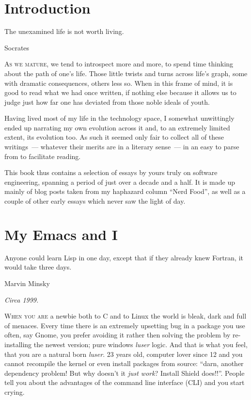 \documentclass{book}
\begin{document}
\pagestyle{empty}
\clearpage

\chapter{Introduction}

\epigraph{The unexamined life is not worth living.}{Socrates}

\lettrine{A}{s we mature}, we tend to introspect more and more, to
spend time thinking about the path of one's life. Those little twists
and turns across life's graph, some with dramatic consequences, others
less so. When in this frame of mind, it is good to read what we had
once written, if nothing else because it allows us to judge just how
far one has deviated from those noble ideals of youth.

Having lived most of my life in the technology space, I somewhat
unwittingly ended up narrating my own evolution across it and, to an
extremely limited extent, its evolution too. As such it seemed only
fair to collect all of these writings~--- whatever their merits are in
a literary sense~--- in an easy to parse from to facilitate reading.

This book thus contains a selection of essays by yours truly on
software engineering, spanning a period of just over a decade and a
half. It is made up mainly of blog posts taken from my haphazard
column ``Nerd Food'', as well as a couple of other early essays which
never saw the light of day.

\pagestyle{headings}

\chapter{My Emacs and I}

\epigraph{Anyone could learn Lisp in one day, except that if they already
  knew Fortran, it would take three days.}{Marvin Minsky}

\begin{flushright}
  \emph{Circa 1999.}
\end{flushright}

\lettrine{W}{hen you are} a newbie both to C and to Linux the world is
bleak, dark and full of menaces. Every time there is an extremely
upsetting bug in a package you use often, say Gnome, you prefer
avoiding it rather then solving the problem by re-installing the
newest version; pure windows \emph{luser} logic. And that is what you
feel, that you are a natural born \emph{luser}. 23 years old, computer
lover since 12 and you cannot recompile the kernel or even install
packages from source: ``darn, another dependency problem!  But why
doesn't it \emph{just work}?  Install Shield does!!''. People tell you
about the advantages of the command line interface (CLI) and you start
crying.
\end{document}
